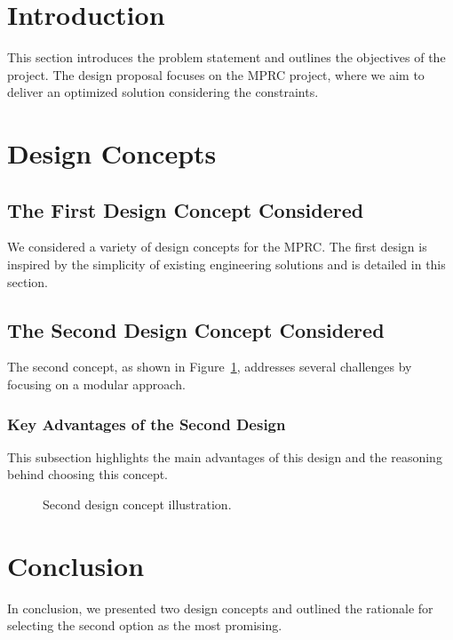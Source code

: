 \documentclass[12pt]{article}
\begin{document}
\section{Introduction}
This section introduces the problem statement and outlines the objectives of the project. The design proposal focuses on the MPRC project, where we aim to deliver an optimized solution considering the constraints.

\section{Design Concepts}
\subsection{The First Design Concept Considered}
We considered a variety of design concepts for the MPRC. The first design is inspired by the simplicity of existing engineering solutions and is detailed in this section.

\subsection{The Second Design Concept Considered}
The second concept, as shown in Figure~\ref{fig:concept2}, addresses several challenges by focusing on a modular approach.

\subsubsection{Key Advantages of the Second Design}
This subsection highlights the main advantages of this design and the reasoning behind choosing this concept.

\begin{figure}[h!]
    \centering
    \caption{Second design concept illustration.}
    \label{fig:concept2}
\end{figure}

\section{Conclusion}
In conclusion, we presented two design concepts and outlined the rationale for selecting the second option as the most promising.
\end{document}
